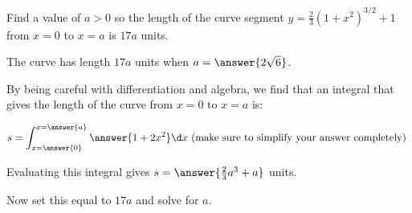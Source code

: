 \documentclass{ximera}
\author{Jim Talamo}
\begin{document}
\begin{exercise}

Find a value of $a>0$ so the length of the curve segment $y=\frac{2}{3}\left(1+x^2\right)^{3/2} +1$ from $x=0$ to $x=a$ is $17a$ units.



The curve has length $17a$ units when $a=\answer{2\sqrt{6}}$.

\begin{hint}
By being careful with differentiation and algebra, we find that an integral that gives the length of the curve from $x=0$ to $x=a$ is:

\[
s= \int_{x=\answer{0}}^{x=\answer{a}} \answer{ 1+2x^2} \d x \textrm{ (make sure to simplify your answer completely) }
\]

Evaluating this integral gives $s = \answer{\frac{2}{3}a^3+a}$ units.

Now set this equal to $17a$ and solve for $a$.
\end{hint}

\end{exercise}
\end{document}
